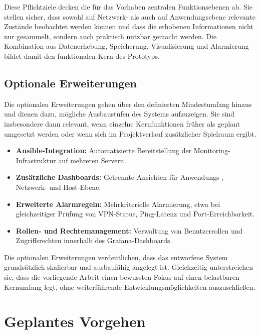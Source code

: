 Diese Pflichtziele decken die für das Vorhaben zentralen Funktionsebenen ab. Sie stellen sicher, dass sowohl auf Netzwerk- als auch auf Anwendungsebene relevante Zustände beobachtet werden können und dass die erhobenen Informationen nicht nur gesammelt, sondern auch praktisch nutzbar gemacht werden. Die Kombination aus Datenerhebung, Speicherung, Visualisierung und Alarmierung bildet damit den funktionalen Kern des Prototyps.  

\subsection{Optionale Erweiterungen}

Die optionalen Erweiterungen gehen über den definierten Mindestumfang hinaus und dienen dazu, mögliche Ausbaustufen des Systems aufzuzeigen. Sie sind insbesondere dann relevant, wenn einzelne Kernfunktionen früher als geplant umgesetzt werden oder wenn sich im Projektverlauf zusätzlicher Spielraum ergibt.  

\begin{itemize}
    \item \textbf{Ansible-Integration:} Automatisierte Bereitstellung der Monitoring-Infrastruktur auf mehreren Servern.  
    
    \item \textbf{Zusätzliche Dashboards:} Getrennte Ansichten für Anwendungs-, Netzwerk- und Host-Ebene.  
    
    \item \textbf{Erweiterte Alarmregeln:} Mehrkriterielle Alarmierung, etwa bei gleichzeitiger Prüfung von VPN-Status, Ping-Latenz und Port-Erreichbarkeit.  
    
    \item \textbf{Rollen- und Rechtemanagement:} Verwaltung von Benutzerrollen und Zugriffsrechten innerhalb des Grafana-Dashboards.  
\end{itemize}

Die optionalen Erweiterungen verdeutlichen, dass das entworfene System grundsätzlich skalierbar und ausbaufähig angelegt ist. Gleichzeitig unterstreichen sie, dass die vorliegende Arbeit einen bewussten Fokus auf einen belastbaren Kernumfang legt, ohne weiterführende Entwicklungsmöglichkeiten auszuschließen.  

\section{Geplantes Vorgehen}

